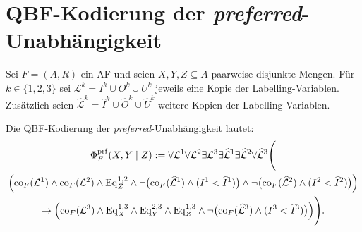 \section{QBF-Kodierung der \textit{preferred}-Unabhängigkeit}

\begin{Definition}
    \label{def:prf-ind-qbf}
    Sei \(F=(A,R)\) ein AF und seien \(X,Y,Z\subseteq A\) paarweise
    disjunkte Mengen. Für \(k\in\{1,2,3\}\) sei
    \( \mathcal{L}^k = I^k \cup O^k \cup U^k\)
    jeweils eine Kopie der Labelling-Variablen. Zusätzlich seien
    \(\widehat{\mathcal{L}}^k = \widehat I^k \cup \widehat O^k \cup \widehat U^k\)
    weitere Kopien der Labelling-Variablen.

    Die QBF-Kodierung der \textit{preferred}-Unabhängigkeit lautet:
    \begin{multline*}
    \Phi^{\mathrm{prf}}_F(X,Y \mid Z)
    :=
    \forall \mathcal{L}^1
    \forall \mathcal{L}^2
    \exists \mathcal{L}^3
    \exists \widehat{\mathcal{L}}^1
    \exists \widehat{\mathcal{L}}^2
    \forall \widehat{\mathcal{L}}^3
    \Biggl(
    \\
    \Bigl(
        \mathrm{co}_F(\mathcal{L}^1)
        \land
        \mathrm{co}_F(\mathcal{L}^2)
        \land
        \mathrm{Eq}^{1,2}_Z
        \land
        \neg\bigl(
            \mathrm{co}_F(\widehat{\mathcal{L}}^1)
            \land
            (I^1 < \widehat I^1)
        \bigr)
        \land
        \neg\bigl(
            \mathrm{co}_F(\widehat{\mathcal{L}}^2)
            \land
            (I^2 < \widehat I^2)
        \bigr)
    \Bigr)
    \\
    \rightarrow
    \Bigl(
        \mathrm{co}_F(\mathcal{L}^3)
        \land
        \mathrm{Eq}^{1,3}_X
        \land
        \mathrm{Eq}^{2,3}_Y
        \land
        \mathrm{Eq}^{1,3}_Z
        \land
        \neg\bigl(
            \mathrm{co}_F(\widehat{\mathcal{L}}^3)
            \land
            (I^3 < \widehat I^3)
        \bigr)
    \Bigr)
    \Biggr).
    \end{multline*}
\end{Definition}
